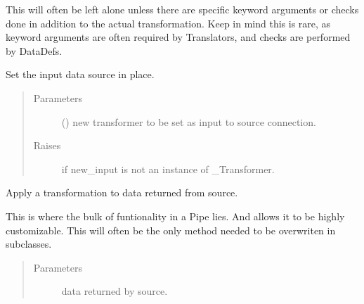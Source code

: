 \documentclass[letterpaper,10pt,english]{sphinxmanual}
\begin{document}
\begin{fulllineitems}
\begin{fulllineitems}
This will often be left alone unless there are specific keyword
arguments or checks done in addition to the actual transformation.
Keep in mind this is rare, as keyword arguments are often required
by Translators, and checks are performed by DataDefs.

\end{fulllineitems}


\begin{fulllineitems}
\label{\detokenize{dalio.pipe:dalio.pipe.pipe.Pipe.set_input}}
Set the input data source in place.
\begin{quote}\begin{description}
\item[{Parameters}] \leavevmode
{} () \textendash{} new transformer to be set as input to
source connection.

\item[{Raises}] \leavevmode
{} \textendash{} if new\_input is not an instance of \_Transformer.

\end{description}\end{quote}

\end{fulllineitems}


\begin{fulllineitems}
\label{\detokenize{dalio.pipe:dalio.pipe.pipe.Pipe.transform}}
Apply a transformation to data returned from source.

This is where the bulk of funtionality in a Pipe lies. And allows it
to be highly customizable. This will often be the only method needed
to be overwriten in subclasses.
\begin{quote}\begin{description}
\item[{Parameters}] \leavevmode
{} \textendash{} data returned by source.


\end{description}
\end{quote}
\end{fulllineitems}
\end{fulllineitems}
\end{document}
